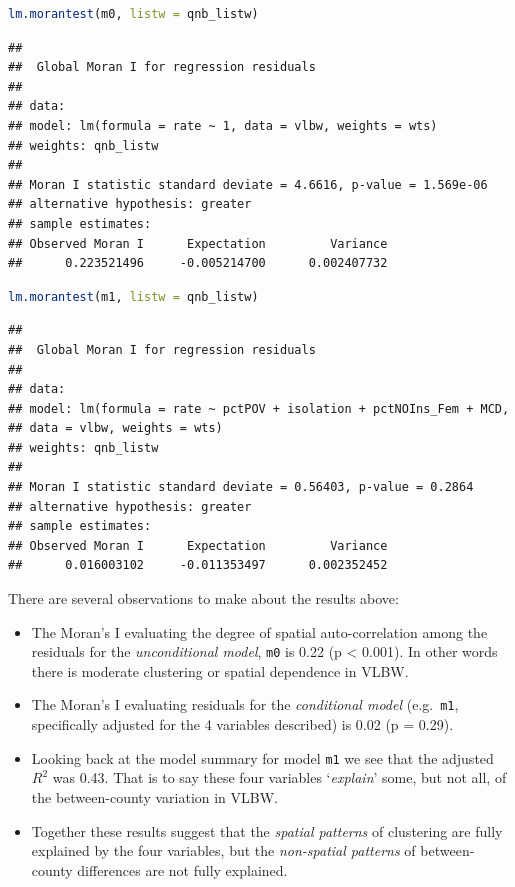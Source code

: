 \documentclass[
]{book}
\newcommand{\passthrough}[1]{#1}
\providecommand{\tightlist}{%
  \setlength{\itemsep}{0pt}\setlength{\parskip}{0pt}}
\begin{document}
\begin{lstlisting}[language=R]
lm.morantest(m0, listw = qnb_listw)
\end{lstlisting}

\begin{lstlisting}
## 
## 	Global Moran I for regression residuals
## 
## data:  
## model: lm(formula = rate ~ 1, data = vlbw, weights = wts)
## weights: qnb_listw
## 
## Moran I statistic standard deviate = 4.6616, p-value = 1.569e-06
## alternative hypothesis: greater
## sample estimates:
## Observed Moran I      Expectation         Variance 
##      0.223521496     -0.005214700      0.002407732
\end{lstlisting}

\begin{lstlisting}[language=R]
lm.morantest(m1, listw = qnb_listw)
\end{lstlisting}

\begin{lstlisting}
## 
## 	Global Moran I for regression residuals
## 
## data:  
## model: lm(formula = rate ~ pctPOV + isolation + pctNOIns_Fem + MCD,
## data = vlbw, weights = wts)
## weights: qnb_listw
## 
## Moran I statistic standard deviate = 0.56403, p-value = 0.2864
## alternative hypothesis: greater
## sample estimates:
## Observed Moran I      Expectation         Variance 
##      0.016003102     -0.011353497      0.002352452
\end{lstlisting}

There are several observations to make about the results above:

\begin{itemize}
\tightlist
\item
  The Moran's I evaluating the degree of spatial auto-correlation among the residuals for the \emph{unconditional model}, \passthrough{\lstinline!m0!} is 0.22 (p \textless{} 0.001). In other words there is moderate clustering or spatial dependence in VLBW.
\item
  The Moran's I evaluating residuals for the \emph{conditional model} (e.g.~\passthrough{\lstinline!m1!}, specifically adjusted for the 4 variables described) is 0.02 (p = 0.29).
\item
  Looking back at the model summary for model \passthrough{\lstinline!m1!} we see that the adjusted \(R^2\) was 0.43. That is to say these four variables `\emph{explain}' some, but not all, of the between-county variation in VLBW.
\item
  Together these results suggest that the \emph{spatial patterns} of clustering are fully explained by the four variables, but the \emph{non-spatial patterns} of between-county differences are not fully explained.
\end{itemize}
\end{document}
